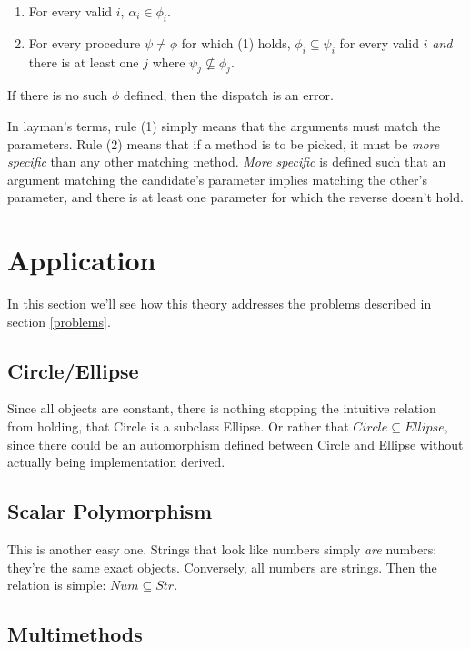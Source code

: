 \documentclass[12pt]{article}
\begin{document}
\begin{enumerate}
\item For every valid $i$, $\alpha_i \in \phi_i$.
\item For every procedure $\psi \not= \phi$ for which (1) holds, $\phi_i
\subseteq \psi_i$ for every valid $i$ \textit{and} there is at least one
$j$ where $\psi_j \not\subseteq \phi_j$.
\end{enumerate}
 
If there is no such $\phi$ defined, then the dispatch is an error.

In layman's terms, rule (1) simply means that the arguments must match
the parameters.  Rule (2) means that if a method is to be picked, it
must be \textit{more specific} than any other matching method.
\textit{More specific} is defined such that an argument matching the
candidate's parameter implies matching the other's parameter, and there
is at least one parameter for which the reverse doesn't hold.

\section{Application}

In this section we'll see how this theory addresses the problems
described in section \ref{problems}.

\subsection{Circle/Ellipse}

Since all objects are constant, there is nothing stopping the intuitive
relation from holding, that Circle is a subclass Ellipse.  Or rather
that $\mathit{Circle} \subseteq \mathit{Ellipse}$, since there could be
an automorphism defined between Circle and Ellipse without actually
being implementation derived.

\subsection{Scalar Polymorphism}

This is another easy one.  Strings that look like numbers simply
\textit{are} numbers: they're the same exact objects.  Conversely, all
numbers are strings.  Then the relation is simple: $\mathit{Num}
\subseteq \mathit{Str}$.

\subsection{Multimethods}
\end{document}
